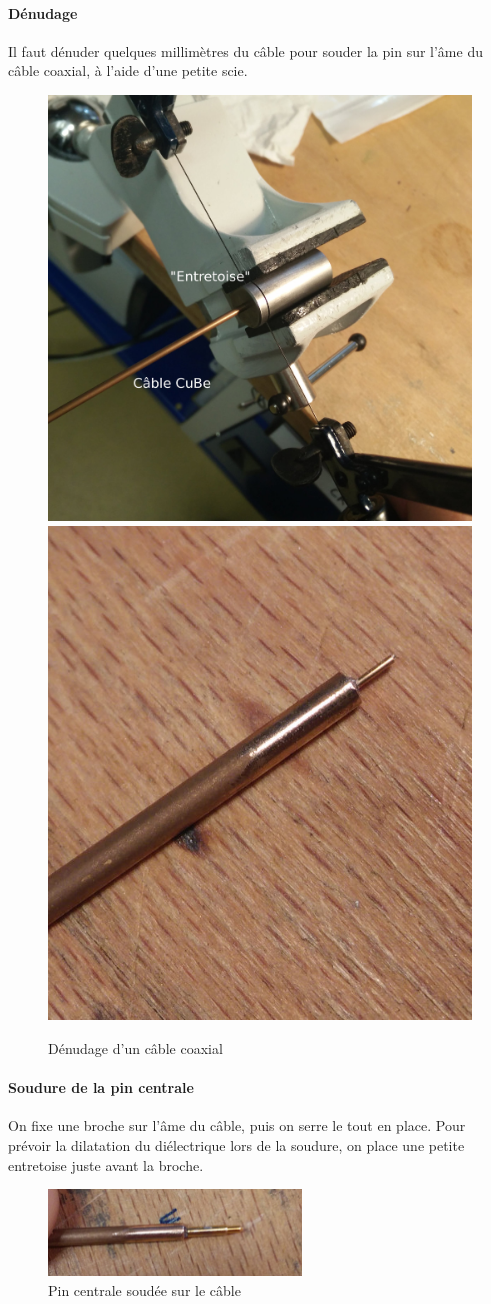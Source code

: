 \paragraph*{Dénudage} Il faut dénuder quelques millimètres du câble pour souder la pin sur l’âme du
câble coaxial, à l'aide d'une petite scie.
\begin{figure}[ht]
    \begin{center}
        \includegraphics[height=0.45\textwidth]{Images/Coax/1}
        \quad
        \includegraphics[height=0.45\textwidth]{Images/Coax/2}
        \caption{Dénudage d'un câble coaxial}
        \label{coax_denudage}
    \end{center}
\end{figure}
\paragraph*{Soudure de la pin centrale} On fixe une broche sur l’âme du câble, puis on serre le tout en
place. Pour prévoir la dilatation du diélectrique lors de la soudure, on place une petite entretoise juste avant la broche.

\begin{figure}[h]
    \begin{center}
        \includegraphics[width=0.60\textwidth]{Images/Coax/3}
        \caption{Pin centrale soudée sur le câble}
        \label{coax_soudure_centre}
    \end{center}
\end{figure}

